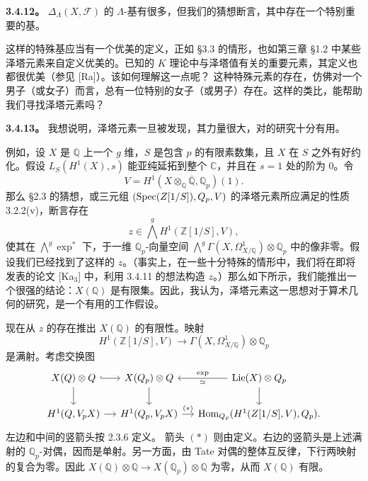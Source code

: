 \textbf{3.4.12。} $\Delta_\Lambda(X,\mathcal F)$ 的 $\Lambda$-基有很多，但我们的猜想断言，其中存在一个特别重要的基。

这样的特殊基应当有一个优美的定义，正如 §3.3 的情形，也如第三章 §1.2 中某些泽塔元素来自定义优美的。已知的 $K$ 理论中与泽塔值有关的重要元素，其定义也都很优美（参见 [Ra]）。该如何理解这一点呢？
这种特殊元素的存在，仿佛对一个男子（或女子）而言，总有一位特别的女子（或男子）存在。这样的类比，能帮助我们寻找泽塔元素吗？

\textbf{3.4.13。} 我想说明，泽塔元素一旦被发现，其力量很大，对的研究十分有用。

例如，设 $X$ 是 $\mathbb Q$ 上一个 $g$ 维，$S$ 是包含 $p$ 的有限素数集，且 $X$ 在 $S$ 之外有好约化。假设 $L_S(H^1(X),s)$ 能亚纯延拓到整个 $\mathbb C$，并且在 $s=1$ 处的阶为 $0$。令
\[
 V=H^1(X\otimes_{\mathbb Q}\overline{\mathbb Q},\mathbb Q_p)(1).
\]
那么 §2.3 的猜想，或三元组 $(\operatorname{Spec}(Z[1/S]),Q_p,V)$ 的泽塔元素所应满足的性质 3.2.2(v)，断言存在
\[
 z\in\bigwedge^g H^1(\mathbb Z[1/S],V),
\]
使其在 $\bigwedge^g\exp^*$ 下，于一维 $\mathbb Q_p$-向量空间
$\bigwedge^g\Gamma(X,\Omega^1_{X/\mathbb Q})\otimes\mathbb Q_p$ 中的像非零。假设我们已经找到了这样的 $z$。（事实上，在一些十分特殊的情形中，我们将在即将发表的论文 [Ka$_3$] 中，利用 3.4.11 的想法构造 $z$。）那么如下所示，我们能推出一个很强的结论：$X(\mathbb Q)$ 是有限集。因此，我认为，泽塔元素这一思想对于算术几何的研究，是一个有用的工作假设。

现在从 $z$ 的存在推出 $X(\mathbb Q)$ 的有限性。映射
\[
 H^1(\mathbb Z[1/S],V)\longrightarrow\Gamma(X,\Omega^1_{X/\mathbb Q})\otimes\mathbb Q_p
\]
是满射。考虑交换图
\[
\begin{tikzcd}[ampersand replacement=\&,column sep=small]
X(\mathbb Q)\otimes\mathbb Q\arrow[r,hook]\arrow[d]\&X(\mathbb Q_p)\otimes\mathbb Q\arrow[d]\&\operatorname{Lie}(X)\otimes\mathbb Q_p\arrow[l,"{\exp}"',"{\simeq}"]\arrow[d]\\
H^1(\mathbb Q,V_pX)\arrow[r]\&H^1(\mathbb Q_p,V_pX)\arrow[r,"{(*)}"]\&\Hom_{\mathbb Q_p}(H^1(\mathbb Z[1/S],V),\mathbb Q_p).
\end{tikzcd}
\]
左边和中间的竖箭头按 2.3.6 定义。
箭头 $(*)$ 则由定义。右边的竖箭头是上述满射的 $\mathbb Q_p$-对偶，因而是单射。另一方面，由 Tate 对偶的整体互反律，下行两映射的复合为零。因此
$X(\mathbb Q)\otimes\mathbb Q\longrightarrow X(\mathbb Q_p)\otimes\mathbb Q$ 为零，从而 $X(\mathbb Q)$ 有限。

